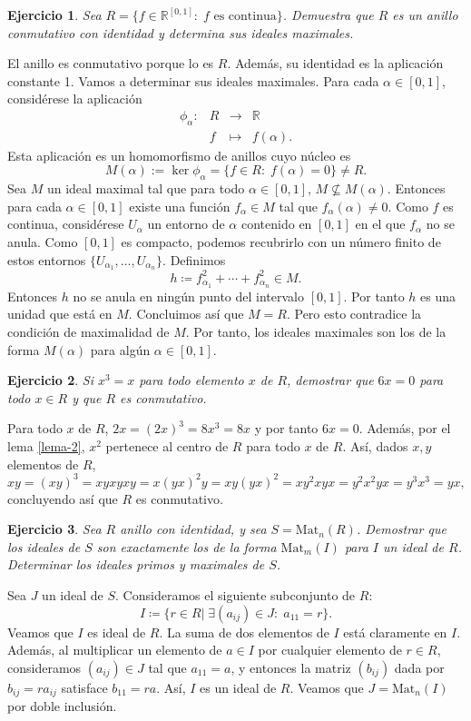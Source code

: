 \documentclass[11pt]{book}
\def\R{\mathbb{R}}
\newtheorem{ej}{Ejercicio}
\theoremstyle{definition}
\begin{document}
\begin{ej}
    Sea $R=\{f\in \R^{[0,1]}:\; f\text{ es continua}\}$. Demuestra que $R$ es un anillo conmutativo con identidad y determina sus ideales maximales.
\end{ej}
\noindent El anillo es conmutativo porque lo es $R$. Además, su identidad es la aplicación constante 1. Vamos a determinar sus ideales maximales. Para cada $\alpha\in [0,1]$, considérese la aplicación\[
\begin{array}{rrcl}
    \phi_\alpha:&R&\longrightarrow&\R\\
    &f&\longmapsto& f(\alpha).
\end{array}
\]Esta aplicación es un homomorfismo de anillos cuyo núcleo es \[
M(\alpha):=\ker\phi_\alpha=\{f\in R:\; f(\alpha)=0\}\neq R.
\]Sea $M$ un ideal maximal tal que para todo $\alpha\in [0,1]$, $M\nsubseteq M(\alpha)$. Entonces para cada $\alpha\in[0,1]$ existe una función $f_\alpha\in M$ tal que $f_\alpha(\alpha)\neq 0$. Como $f$ es continua, considérese $U_\alpha$ un entorno de $\alpha$ contenido en $[0,1]$ en el que $f_\alpha$ no se anula. Como $[0,1]$ es compacto, podemos recubrirlo con un número finito de estos entornos $\{U_{\alpha_1},\dots, U_{\alpha_n}\}$. Definimos\[
h\coloneq f_{\alpha_1}^2+\cdots + f_{\alpha_n}^2\in M.
\]Entonces $h$ no se anula en ningún punto del intervalo $[0,1]$. Por tanto $h$ es una unidad que está en $M$. Concluimos así que $M=R$. Pero esto contradice la condición de maximalidad de $M$. Por tanto, los ideales maximales son los de la forma $M(\alpha)$ para algún $\alpha\in [0,1]$.

\begin{ej}
    Si $x^3=x$ para todo elemento $x$ de $R$, demostrar que $6x=0$ para todo $x\in R$ y que $R$ es conmutativo.
\end{ej}
Para todo $x$ de $R$, $2x=(2x)^3=8x^3=8x$ y por tanto $6x=0$. Además, por el lema \ref{lema-2}, $x^2$ pertenece al centro de $R$ para todo $x$ de $R$. Así, dados $x,y$ elementos de $R$,\[
xy=(xy)^3=xyxyxy=x(yx)^2y=xy(yx)^2=xy^2xyx=y^2x^2yx=y^3x^3=yx,
\]concluyendo así que $R$ es conmutativo.

\begin{ej}
    Sea $R$ anillo con identidad, y sea $S=\mathrm{Mat}_n(R)$. Demostrar que los ideales de $S$ son exactamente los de la forma $\mathrm{Mat}_m(I)$ para $I$ un ideal de $R$. Determinar los ideales primos y maximales de $S$.
\end{ej}
Sea $J$ un ideal de $S$. Consideramos el siguiente subconjunto de $R$:\[
I\coloneq\{r\in R|\;\exists (a_{ij})\in J:\;a_{11}=r\}.
\]Veamos que $I$ es ideal de $R$. La suma de dos elementos de $I$ está claramente en $I$. Además, al multiplicar un elemento de $a\in I$ por cualquier elemento de $r\in R$, consideramos $(a_{ij})\in J$ tal que $a_{11}=a$, y entonces la matriz $(b_{ij})$ dada por $b_{ij}=ra_{ij}$ satisface $b_{11}=ra$. Así, $I$ es un ideal de $R$. Veamos que $J=\mathrm{Mat}_n(I)$ por doble inclusión.
\end{document}
